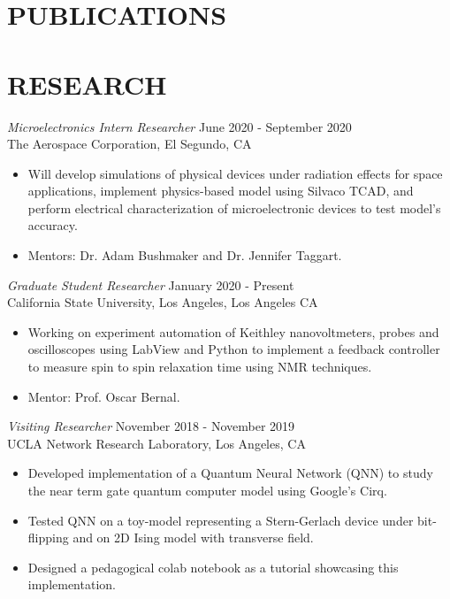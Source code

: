\documentclass[margin,line]{res}
\let\origsection\section%
\let\section\subsection%
\let\section\origsection%
\begin{document}
\begin{resume}
\section{\mysidestyle  PUBLICATIONS}  
\printbibliography[heading=none, type=inproceedings,sorting=ynt ]

\section{ \mysidestyle  RESEARCH} 
{\sl Microelectronics Intern Researcher} \hfill June 2020 - September 2020 \\
The Aerospace Corporation, El Segundo, CA
				\begin{itemize}
				\itemsep -2pt
\item Will develop simulations of physical devices under radiation effects for space applications, implement physics-based model using Silvaco TCAD, and perform electrical characterization of microelectronic devices to test model's accuracy. 
\item Mentors: Dr. Adam Bushmaker and Dr. Jennifer Taggart.
					\end{itemize}
					

{\sl Graduate Student Researcher} \hfill January 2020 - Present\\
California State University, Los Angeles, Los Angeles CA
				\begin{itemize}
					\itemsep -2pt
					\item Working on experiment automation of Keithley nanovoltmeters, probes and oscilloscopes using LabView and Python to implement a feedback controller to measure spin to spin relaxation time using NMR techniques.
					\item Mentor: Prof. Oscar Bernal.
					\end{itemize}


{\sl Visiting Researcher} \hfill November 2018 - November 2019 \\
				UCLA Network Research Laboratory, 
                Los Angeles, CA 
				\begin{itemize}
					\itemsep -2pt
					\item Developed implementation of a Quantum Neural Network (QNN) to study the near term gate quantum computer model using Google's Cirq.  
					\item Tested QNN on a toy-model representing a Stern-Gerlach device under bit-flipping and on 2D Ising model with transverse field.
					\item Designed a pedagogical colab notebook as a tutorial showcasing this implementation.
				\end{itemize}


\end{resume}
\end{document}
